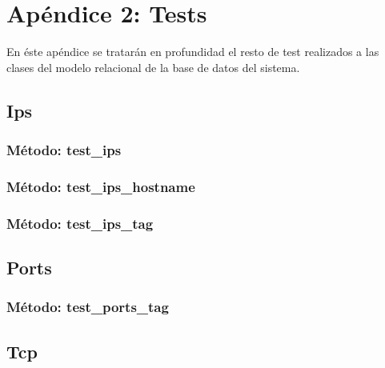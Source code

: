 \chapter{Apéndice 2: Tests}
\label{chap:tests}

En éste apéndice se tratarán en profundidad el resto de test realizados a las clases del modelo relacional de la base de datos del sistema.

\section{\quad Ips}



\subsection{\quad Método: test\_ips}



\subsection{\quad Método: test\_ips\_hostname}



\subsection{\quad Método: test\_ips\_tag}



\section{\quad Ports}



\subsection{\quad Método: test\_ports\_tag}



\section{\quad Tcp}

